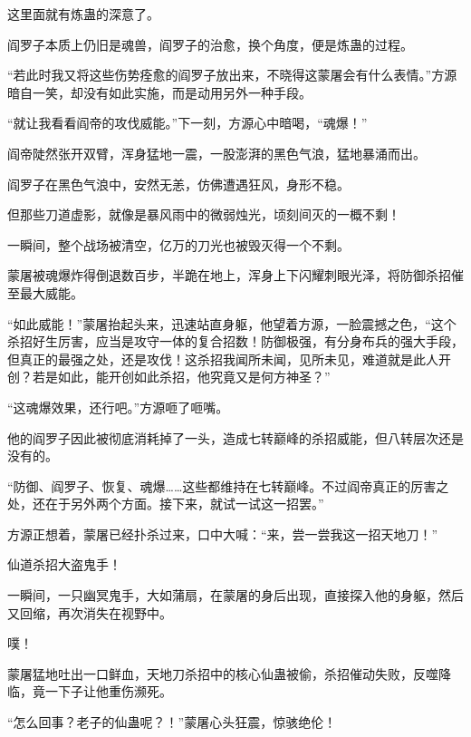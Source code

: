 \begin{this_body}
这里面就有炼蛊的深意了。

阎罗子本质上仍旧是魂兽，阎罗子的治愈，换个角度，便是炼蛊的过程。

“若此时我又将这些伤势痊愈的阎罗子放出来，不晓得这蒙屠会有什么表情。”方源暗自一笑，却没有如此实施，而是动用另外一种手段。

“就让我看看阎帝的攻伐威能。”下一刻，方源心中暗喝，“魂爆！”

阎帝陡然张开双臂，浑身猛地一震，一股澎湃的黑色气浪，猛地暴涌而出。

阎罗子在黑色气浪中，安然无恙，仿佛遭遇狂风，身形不稳。

但那些刀道虚影，就像是暴风雨中的微弱烛光，顷刻间灭的一概不剩！

一瞬间，整个战场被清空，亿万的刀光也被毁灭得一个不剩。

蒙屠被魂爆炸得倒退数百步，半跪在地上，浑身上下闪耀刺眼光泽，将防御杀招催至最大威能。

“如此威能！”蒙屠抬起头来，迅速站直身躯，他望着方源，一脸震撼之色，“这个杀招好生厉害，应当是攻守一体的复合招数！防御极强，有分身布兵的强大手段，但真正的最强之处，还是攻伐！这杀招我闻所未闻，见所未见，难道就是此人开创？若是如此，能开创如此杀招，他究竟又是何方神圣？”

“这魂爆效果，还行吧。”方源咂了咂嘴。

他的阎罗子因此被彻底消耗掉了一头，造成七转巅峰的杀招威能，但八转层次还是没有的。

“防御、阎罗子、恢复、魂爆……这些都维持在七转巅峰。不过阎帝真正的厉害之处，还在于另外两个方面。接下来，就试一试这一招罢。”

方源正想着，蒙屠已经扑杀过来，口中大喊：“来，尝一尝我这一招天地刀！”

仙道杀招大盗鬼手！

一瞬间，一只幽冥鬼手，大如蒲扇，在蒙屠的身后出现，直接探入他的身躯，然后又回缩，再次消失在视野中。

噗！

蒙屠猛地吐出一口鲜血，天地刀杀招中的核心仙蛊被偷，杀招催动失败，反噬降临，竟一下子让他重伤濒死。

“怎么回事？老子的仙蛊呢？！”蒙屠心头狂震，惊骇绝伦！

\end{this_body}

